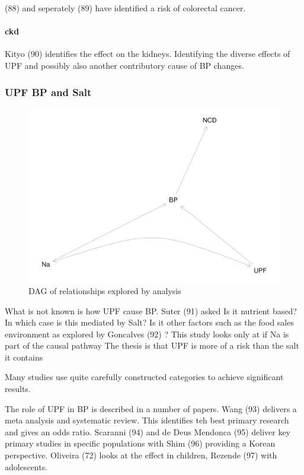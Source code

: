 \documentclass[
]{article}
\begin{document}
(88) and seperately (89) have identified a risk of colorectal cancer.

\hypertarget{ckd}{%
\paragraph{ckd}\label{ckd}}

Kityo (90) identifies the effect on the kidneys. Identifying the diverse
effects of UPF and possibly also another contributory cause of BP
changes.

\hypertarget{upf-bp-and-salt}{%
\subsubsection{UPF BP and Salt}\label{upf-bp-and-salt}}

\begin{figure}
\centering
\includegraphics{methodandresults_files/figure-latex/fig-dagupfbp-1.pdf}
\caption{DAG of relationships explored by analysis}
\end{figure}

What is not known is how UPF cause BP. Suter (91) asked Is it nutrient
based? In which case is this mediated by Salt? Is it other factors such
as the food sales environment as explored by Goncalves (92) ? This study
looks only at if Na is part of the causal pathway The thesis is that UPF
is more of a risk than the salt it contains

Many studies use quite carefully constructed categories to achieve
significant results.

The role of UPF in BP is described in a number of papers. Wang (93)
delivers a meta analysis and systematic review. This identifies teh best
primary research and gives an odds ratio. Scaranni (94) and de Deus
Mendonca (95) deliver key primary studies in specific populations with
Shim (96) providing a Korean perspective. Oliveira (72) looks at the
effect in children, Rezende (97) with adolescents.
\end{document}
